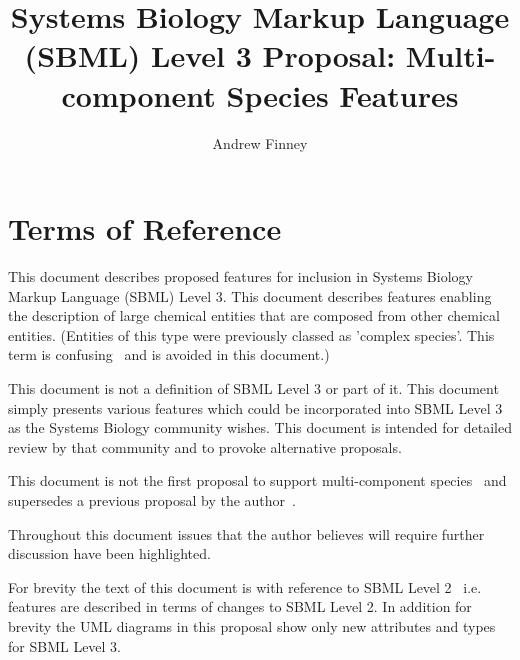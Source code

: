 \documentclass{cekarticle}
\begin{document}

\title{Systems Biology Markup Language (SBML) Level 3 Proposal: Multi-component Species Features}

\author{Andrew Finney}


\maketitlepage


\section{Terms of Reference}
\label{sec:t-o-r}

This document describes proposed features for inclusion in
Systems Biology Markup Language (SBML) Level 3. This document
describes features enabling the description of large chemical entities that are composed
from other chemical entities.  (Entities of this type were previously classed as 'complex species'.
This term is confusing~\citep{phair:2003} and is avoided in this document.)

This document is not a definition of SBML Level 3 or part of it.
This document simply presents various features which could be
incorporated into SBML Level 3 as the Systems Biology community
wishes.  This document is intended for detailed review by that
community and to provoke alternative proposals.

This document is not the first proposal to support multi-component species~\citep{lenovere:2002}
and supersedes a previous proposal by the author~\citep{finney:2001f}.

Throughout this
document issues that the author believes will require further
discussion have been highlighted.

For brevity the text of this document is with reference to SBML
Level 2~\citep{finney:2002f} i.e. features are described in terms
of changes to SBML Level 2.  In addition for brevity the UML diagrams in this proposal
show only new attributes and types for SBML Level 3.
\end{document}

